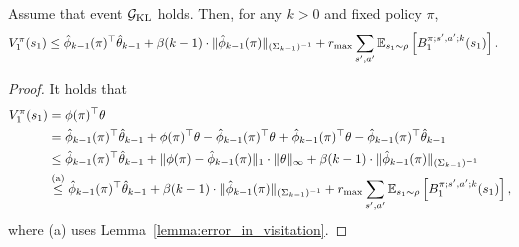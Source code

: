 \begin{lemma}	\label{lemma:optimism}
	Assume that event $\mathcal{G}_{\textup{KL}}$ holds. Then, for any $k>0$ and fixed policy $\pi$,
	\begin{align*}
		V^{\pi}_1(s_1) &\leq \hat{\phi}_{k-1}(\pi)^\top \hat{\theta}_{k-1} + \beta(k-1) \cdot  \|\hat{\phi}_{k-1}(\pi)\|_{(\Sigma_{k-1})^{-1}} + r_{\max} \sum_{s',a'} \mathbb{E}_{s_1 \sim \rho}\left[ B^{\pi;s',a';k}_1(s_1) \right] .
	\end{align*}
\end{lemma}
\begin{proof}
	It holds that
	\begin{align*}
		V^{\pi}_1(s_1) &= \phi(\pi)^\top \theta 
		\\
		&= \hat{\phi}_{k-1}(\pi)^\top \hat{\theta}_{k-1} + \phi(\pi)^\top \theta - \hat{\phi}_{k-1}(\pi)^\top \theta + \hat{\phi}_{k-1}(\pi)^\top \theta - \hat{\phi}_{k-1}(\pi)^\top \hat{\theta}_{k-1}
		\\
		&\leq \hat{\phi}_{k-1}(\pi)^\top \hat{\theta}_{k-1} + \|\phi(\pi) - \hat{\phi}_{k-1}(\pi)\|_1 \cdot \|\theta\|_{\infty} + \beta(k-1) \cdot  \|\hat{\phi}_{k-1}(\pi)\|_{(\Sigma_{k-1})^{-1}}
		\\
		&\overset{\textup{(a)}}{\leq} \hat{\phi}_{k-1}(\pi)^\top \hat{\theta}_{k-1} + \beta(k-1) \cdot  \|\hat{\phi}_{k-1}(\pi)\|_{(\Sigma_{k-1})^{-1}} + r_{\max} \sum_{s',a'} \mathbb{E}_{s_1 \sim \rho}\left[ B^{\pi;s',a';k}_1(s_1) \right] ,
	\end{align*}
	where (a) uses Lemma~\ref{lemma:error_in_visitation}.
\end{proof}


